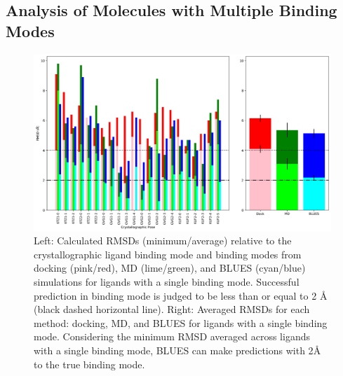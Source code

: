\subsection{Analysis of Molecules with Multiple Binding Modes}

\begin{figure}
    \centering
    \includegraphics[width=\linewidth]{chapter6/Figures/multibm.png}
    \caption[Multiple Binding Mode RMSDs]{Left: Calculated RMSDs (minimum/average) relative to the crystallographic ligand binding mode and binding modes from docking (pink/red), MD (lime/green), and BLUES (cyan/blue) simulations for ligands with a single binding mode. Successful prediction in binding mode is judged to be less than or equal to 2 {\AA} (black dashed horizontal line). Right: Averaged RMSDs for each method: docking, MD, and BLUES for ligands with a single binding mode. Considering the minimum RMSD averaged across ligands with a single binding mode, BLUES can make predictions with 2{\AA} to the true binding mode.}
    \label{fig:multibm}
\end{figure}

